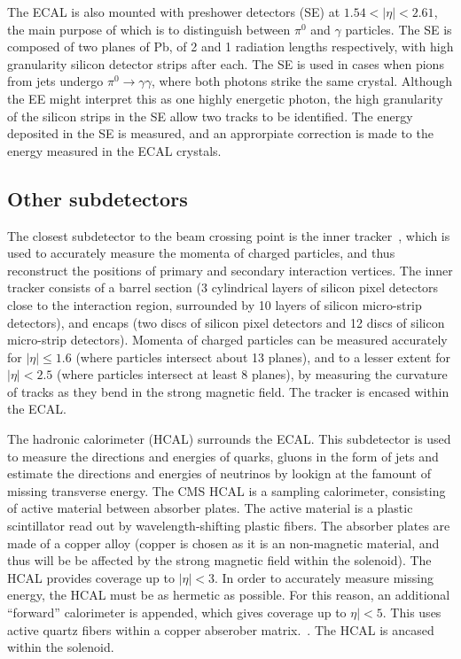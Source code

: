 \documentclass[10pt]{article}
\begin{document}
The ECAL is also mounted with preshower detectors (SE) at $1.54 <|\eta| < 2.61$, the main purpose of which is to distinguish between $\pi^0$ and $\gamma$ particles. The SE is composed of two planes of Pb, of 2 and 1 radiation lengths respectively, with high granularity silicon detector strips after each. The SE is used in cases when pions from jets undergo $\pi^0\rightarrow \gamma \gamma$, where both photons strike the same crystal. Although the EE might interpret this as one highly energetic photon, the high granularity of the silicon strips in the SE allow two tracks to be identified. The energy deposited in the SE is measured, and an approrpiate correction is made to the energy measured in the ECAL crystals.

\subsection{Other subdetectors}

The closest subdetector to the beam crossing point is the inner tracker~\cite{cmsTrk}, which is used to accurately measure the momenta of charged particles, and thus reconstruct the positions of primary  and secondary interaction vertices. The inner tracker consists of a barrel section (3 cylindrical layers of silicon pixel detectors close to the interaction region, surrounded by 10 layers of silicon micro-strip detectors), and encaps (two discs of silicon pixel detectors and 12 discs of silicon micro-strip detectors). Momenta of charged particles can be measured accurately for $|\eta|\leq 1.6$ (where particles intersect about 13 planes), and to a lesser extent for $|\eta| <2.5$ (where particles intersect at least 8 planes), by measuring the curvature of tracks as they bend in the strong magnetic field. The tracker is encased within the ECAL.

The hadronic calorimeter (HCAL) surrounds the ECAL. This subdetector is used to measure the directions and energies of quarks, gluons in the form of jets and estimate the directions and energies of neutrinos by lookign at the famount of missing transverse energy. The CMS HCAL is a sampling calorimeter, consisting of active material between absorber plates. The active material is a plastic scintillator read out by  wavelength-shifting plastic fibers. The absorber plates are made of a copper alloy (copper is chosen as it is an non-magnetic material, and thus will be be affected by the strong magnetic field within the solenoid). The HCAL provides coverage up to $|\eta| < 3$. In order to accurately measure missing energy, the HCAL must be as hermetic as possible. For this reason, an additional ``forward'' calorimeter is appended, which gives coverage up to $\eta| <5$. This uses active quartz fibers within a copper abserober matrix.~\cite{cmsHcal}. The HCAL is ancased within the solenoid.
\end{document}
